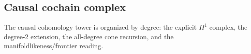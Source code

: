 \subsection{Causal cochain complex}

The causal cohomology tower is organized by degree: the explicit $H^1$
complex, the degree-2 extension, the all-degree cone recursion, and the
manifoldlikeness/frontier reading.





